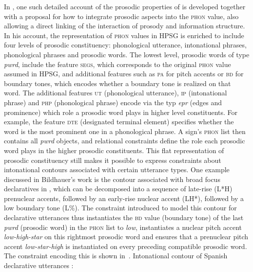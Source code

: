 \documentclass[output=paper]{langsci/langscibook}
\begin{document}
In \cite{Bildhauer2008a}, one such detailed account of the prosodic
properties of  is developed together with a proposal for how to
integrate prosodic aspects into the \textsc{phon} value, also allowing
a direct linking of the interaction of prosody and information
structure.  In his account, the representation of \textsc{phon} values
in HPSG is enriched to include four levels of prosodic constituency:
phonological utterance, intonational phrases, phonological
phrases and prosodic words. The lowest level, prosodic words of type
\textit{pwrd}, include the feature \textsc{segs}, which corresponds to
the original \textsc{phon} value assumed in HPSG, and additional
features such as \textsc{pa} for pitch accents or \textsc{bd} for
boundary tones, which encodes whether a boundary tone is realized on that
word. The additional features \textsc{ut} (phonological utterance),
\textsc{ip} (intonational phrase) and \textsc{php} (phonological phrase)
encode via the typ \textit{epr} (edges and prominence) which role
a prosodic word plays in higher level constituents. For example, the
feature \textsc{dte} (designated terminal element) specifies whether
the word is the most prominent one in a phonological phrase. A sign's
\textsc{phon} list then contains all \textit{pwrd} objects, and
relational constraints define the role each prosodic word plays in
the higher prosodic constituents. This flat representation of prosodic
constituency still makes it possible to express constraints about intonational
contours associated with certain utterance types. One example
discussed in Bildhauer's work is the contour associated with broad
focus declaratives in , which can be decomposed into a
sequence of late-rise (L*H) prenuclear accents, followed by an
early-rise nuclear accent (LH*), followed by a low boundary tone
(L\%). The constraint introduced to model this contour for declarative
utterances thus instantiates the \textsc{bd} value (boundary tone) of
the last \textit{pwrd} (prosodic word) in the \textsc{phon} list to \textit{low}, instantiates
a nuclear pitch accent \textit{low-high-star} on this rightmost
prosodic word and ensures that a prenuclear pitch accent
\textit{low-star-high} is instantiated on every preceding compatible
prosodic word. The constraint encoding this is shown in~.
\ea
Intonational contour of Spanish declarative utterances \citep[142]{Bildhauer2008a}:\\
\end{document}

